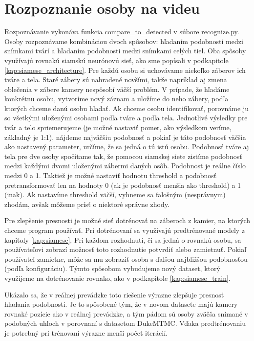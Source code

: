 \section{Rozpoznanie osoby na videu}
Rozpoznávanie vykonáva funkcia compare\_to\_detected v súbore recognize.py.
Osoby rozpoznávame kombináciou dvoch spôsobov: hľadaním podobnosti medzi snímkami tvárí a hľadaním podobnosti medzi snímkami celých tiel.
Oba spôsoby využívajú rovnakú siamskú neurónovú sieť, ako sme popísali v podkapitole \ref{kap:siamese_architecture}. 
Pre každú osobu si uchovávame niekoľko záberov ich tváre a tela. 
Staré zábery sú nahradené novšími, takže napríklad aj zmena oblečenia v zábere kamery nespôsobí väčší problém.
V prípade, že hľadáme konkrétnu osobu, vytvoríme nový záznam a uložíme do neho zábery, podľa ktorých chceme danú osobu hľadať.
Ak chceme osobu identifikovať, porovnáme ju so všetkými uloženými osobami podľa tváre a podľa tela.
Jednotlivé výsledky pre tvár a telo spriemerujeme (je možné nastaviť pomer, ako výsledkom veríme, základný je 1:1), nájdeme najväčšiu podobnosť a pokiaľ je táto podobnosť väčšia ako nastavený parameter, určíme, že sa jedná o tú istú osobu.
Podobnosť tváre aj tela pre dve osoby spočítame tak, že pomocou siamskej siete zistíme podobnosť medzi každými dvomi uloženými zábermi daných osôb.
Podobnosť je reálne číslo medzi 0 a 1.
Taktiež je možné nastaviť hodnotu threshold a podobnosť pretransformovať len na hodnoty 0 (ak je podobnosť menšia ako threshold) a 1 (inak).
Ak nastavíme threshold väčší, vyhneme sa falošným (nesprávnym) zhodám, avšak môžeme prísť o niektoré správne zhody.



Pre zlepšenie presnosti je možné sieť dotrénovať na záberoch z kamier, na ktorých chceme program používať.
Pri dotrénovaní sa využívajú predtrénované modely z kapitoly \ref{kap:siamese}.
Pri každom rozhodnutí, či sa jedná o rovnakú osobu, sa používateľovi zobrazí možnosť toto rozhodnutie potvrdiť alebo zamietnuť.
Pokiaľ používateľ zamietne, môže sa mu zobraziť osoba s ďalšou najbližšou podobnosťou (podľa konfiguráciu).
Týmto spôsobom vybudujeme nový dataset, ktorý využijeme na dotrénovanie rovnako, ako v podkapitole \ref{kap:siamese_train}.

Ukázalo sa, že v reálnej prevádzke toto riešenie výrazne zlepšuje presnosť hľadania podobnosti.
Je to spôsobené tým, že v novom datasete majú kamery rovnaké pozície ako v reálnej prevádzke, a tým pádom sú osoby zväčša snímané v podobných uhloch v porovnaní s datasetom DukeMTMC.
Vďaka predtrénovaniu je potrebný pri trénovaní výrazne menši počet iterácií.

